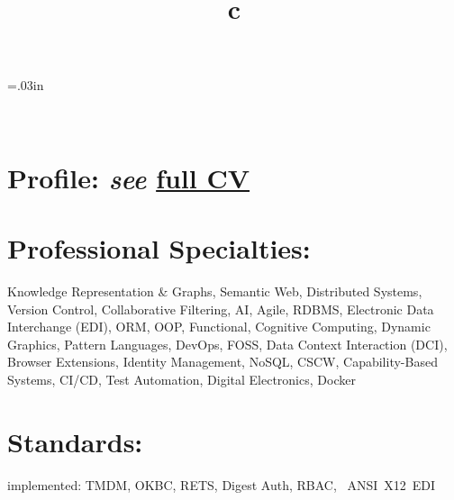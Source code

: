 \documentclass[line,margin,hidelinks]{res}
\begin{document}


\begin{resume}

\sectionskip=.03in

\begin{format}
\title{c}\\
\end{format}


\section{Profile:
  \newline \newline
  \maybemugshot
  \footnotesize{\textit{see} \href{\cvUrl}{full CV}}
}



\section{Professional Specialties:}
\begin{par}
\small{Knowledge Representation \& Graphs,
Semantic Web,
Distributed Systems,
Version Control,
Collaborative Filtering,
AI,
Agile,
RDBMS,
Electronic Data Interchange (EDI),
ORM,
OOP,
Functional,
Cognitive Computing,
Dynamic Graphics,
Pattern Languages,
DevOps,
FOSS,
Data Context Interaction (DCI),
Browser Extensions,
Identity Management,
NoSQL,
CSCW,
Capability-Based Systems,
CI/CD,
Test Automation,
Digital Electronics,
Docker}
\end{par}

\section{Standards:}
\begin{par}
implemented:
TMDM,
OKBC,
RETS,
Digest Auth,
RBAC,
~ANSI~X12~EDI
\end{par}


\end{resume}
\end{document}
